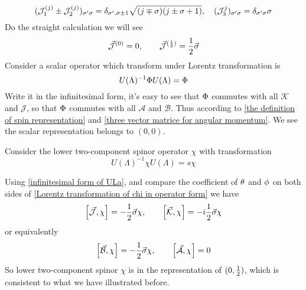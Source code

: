 \begin{equation} \label{three vector matrice for angular momentum}
(\mathcal{J}_1^{(j)}\pm \mathcal{J}_2^{(j)})_{\sigma'\sigma} = \delta_{\sigma',\sigma\pm 1}
\sqrt{(j\mp\sigma)(j\pm\sigma+1)},\quad
(\mathcal{J}_3^{j})_{\sigma'\sigma} = \delta_{\sigma'\sigma} \sigma
\end{equation}
Do the straight calculation we will see
\begin{equation}
  \vec{\mathcal{J}}^{(0)} = 0, \qquad
  \vec{\mathcal{J}}^{(\frac{1}{2})} = \frac{1}{2} \vec{\sigma}
\end{equation}
Consider a scalar operator which transform under Lorentz transformation is
\begin{equation}
  U(\Lambda)^{-1} \Phi U(\Lambda) = \Phi
\end{equation}
Write it in the infinitesimal form, it's easy to see that $\Phi$ commutes with all $\mathcal{K}$ and $\mathcal{J}$, so that  $\Phi$ commutes with all $\mathcal{A}$ and $\mathcal{B}$. Thus according to \eqref{the definition of spin representation} and \eqref{three vector matrice for angular momentum}. We see the scalar representation belongs to $(0,0)$.

Consider the lower two-component spinor operator $\chi$ with transformation
\begin{equation} \label{Lorentz transformation of chi in operator form}
U(\Lambda)^{-1}\chi U(\Lambda) = s \chi
\end{equation}

Using \eqref{infinitesimal form of ULa}, and compare the coefficient of $\theta$ and $\phi$ on both sides of \eqref{Lorentz transformation of chi in operator form} we have
\begin{equation}
  \comm{\vec{\mathcal{J}}}{\chi} = -\half \vec{\s}\chi,\qquad
\comm{\vec{\mathcal{K}}}{\chi} = - i\half \vec{\s}\chi
\end{equation}
or equivalently
\begin{equation}
  \comm{\vec{\mathcal{B}}}{\chi} =- \half \vec{\s}\chi,\qquad
\comm{\vec{\mathcal{A}}}{\chi} =0
\end{equation}
So lower two-component spinor $\chi$ is in the representation of $(0,\frac{1}{2})$, which is consistent to what we have illustrated before.

